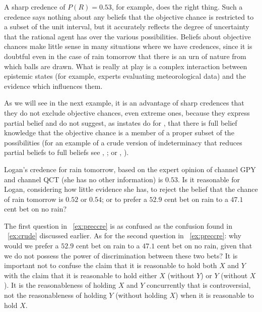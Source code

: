 \documentclass[phd,12pt,oneside]{ubcthesis}
\begin{document}
A sharp credence of $P(R)=0.53$, for example, does the right thing.
Such a credence says nothing about any beliefs that the objective
chance is restricted to a subset of the unit interval, but it
accurately reflects the degree of uncertainty that the rational agent
has over the various possibilities. Beliefs about objective chances
make little sense in many situations where we have credences, since it
is doubtful even in the case of rain tomorrow that there is an urn of
nature from which balls are drawn. What is really at play is a complex
interaction between epistemic states (for example, experts evaluating
meteorological data) and the evidence which influences them.

As we will see in the next example, it is an advantage of sharp
credences that they do not exclude objective chances, even extreme
ones, because they express partial belief and do not suggest, as
instates do for {\anderson}, that there is full belief knowledge
that the objective chance is a member of a proper subset of the
possibilities (for an example of a crude version of indeterminacy that
reduces partial beliefs to full beliefs see ,
; or ,
).

\begin{quotex}
  \label{ex:preccre} Logan's credence for
  rain tomorrow, based on the expert opinion of channel GPY and
  channel QCT (she has no other information) is $0.53$. Is it
  reasonable for Logan, considering how little evidence she has, to
  reject the belief that the chance of rain tomorrow is $0.52$ or
  $0.54$; or to prefer a $52.9$ cent bet on rain to a $47.1$ cent bet
  on no rain?
\end{quotex}

The first question in {\xample}~\ref{ex:preccre} is as confused as the
{\anderson} confusion found in {\xample}~\ref{ex:crude} discussed
earlier. As for the second question in {\xample}~\ref{ex:preccre}: why
would we prefer a $52.9$ cent bet on rain to a $47.1$ cent bet on no
rain, given that we do not possess the power of discrimination between
these two bets? It is important not to confuse the claim that it is
reasonable to hold both $X$ and $Y$ with the claim that it is
reasonable to hold either $X$ (without $Y$) or $Y$ (without $X$). It
is the reasonableness of holding $X$ and $Y$ concurrently that is
controversial, not the reasonableness of holding $Y$ (without holding
$X$) when it is reasonable to hold $X$.
\end{document}
